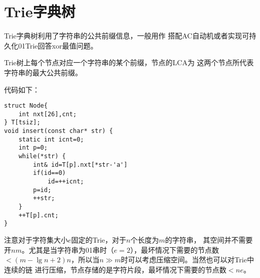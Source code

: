 \section{Trie字典树}
Trie字典树利用了字符串的公共前缀信息，一般用作
搭配AC自动机或者实现可持久化01Trie回答xor最值问题。

Trie树上每个节点对应一个字符串的某个前缀，节点的LCA为
这两个节点所代表字符串的最大公共前缀。

代码如下：
\begin{lstlisting}
struct Node{
    int nxt[26],cnt;
} T[tsiz];
void insert(const char* str) {
    static int icnt=0;
    int p=0;
    while(*str) {
        int& id=T[p].nxt[*str-'a']
        if(id==0)
            id=++icnt;
        p=id;
        ++str;
    }
    ++T[p].cnt;
}
\end{lstlisting}

注意对于字符集大小$e$固定的Trie，对于$n$个长度为$m$的字符串，
其空间并不需要开$nm$。尤其是当字符串为01串时（$e=2$），最坏情况下需要的节点数
$<(m-\lg n+2)n$，所以当$n\gg m$时可以考虑压缩空间。当然也可以对Trie中连续的链
进行压缩，节点存储的是字符片段，最坏情况下需要的节点数$<ne$。
